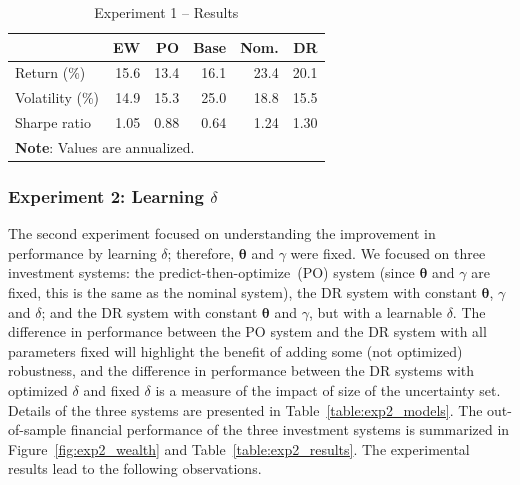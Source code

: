 \documentclass[10pt, twocolumn]{article}
\theoremstyle{plain}
\theoremstyle{definition}
\begin{document}
\begin{table}[t]
\caption{Experiment 1 -- Results}
\centering
\begin{tabular}{lrrrrr}
\toprule
				& EW & PO & Base & Nom. & DR\\
\midrule
Return (\%)     & 15.6 & 13.4 & 16.1 & 23.4 & 20.1 \\
Volatility (\%) & 14.9 & 15.3 & 25.0 & 18.8 & 15.5 \\
Sharpe ratio    & 1.05 & 0.88 & 0.64 & 1.24 & 1.30 \\
\bottomrule
\multicolumn{5}{p{0.6\linewidth}}{\small\rule{0pt}{3ex}\textbf{Note}: Values are annualized.}\\
\end{tabular}
\label{table:exp1_results}
\end{table}

\subsubsection{Experiment 2: Learning \texorpdfstring{\(\delta\)}{Lg}}\label{sec:learn_delta}

The second experiment focused on understanding the improvement in 
performance by learning \(\delta\); therefore, \(\bm{\theta}\) and 
\(\gamma\) were fixed. We focused on three investment systems: the 
predict-then-optimize~(PO) system (since \(\bm{\theta}\) and \(\gamma\) 
are fixed, this is the same as the nominal system), the DR system with 
constant \(\bm{\theta}\), \(\gamma\) and \(\delta\); and the  DR
system  with constant \(\bm{\theta}\) and \(\gamma\), but with a learnable
\(\delta\). The difference in performance between the PO system and the DR
system with all parameters fixed will highlight the benefit of adding some
(not optimized) robustness, and the difference in performance between the DR
systems with optimized \(\delta\) and fixed \(\delta\) is a measure of the
impact of size of the uncertainty set. Details of the three systems are 
presented in Table~\ref{table:exp2_models}. The out-of-sample
financial performance of the three investment systems is summarized
in Figure~\ref{fig:exp2_wealth} and Table~\ref{table:exp2_results}. 
The experimental results lead to the following observations.
\end{document}

